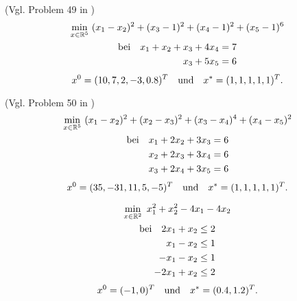 \begin{testproblem}
(Vgl. Problem 49 in \cite[S.~72]{hock})
\begin{gather}
\min_{x\in\mathbb{R}^5}\ (x_1-x_2)^2 + (x_3-1)^2 + (x_4-1)^2 + (x_5-1)^6  \notag \\
\begin{split}
\text{bei}\quad x_1 + x_2 + x_3 + 4 x_4 & = 7 \\
x_3 + 5 x_5 & = 6 \\
\end{split}
\end{gather}
\begin{equation*}
x^0 = (10, 7, 2, -3, 0.8)^T \quad\text{und}\quad x^* = (1, 1, 1, 1, 1)^T.
\end{equation*}
\end{testproblem}

\begin{testproblem}
\label{test_prob:prob_A_hs50}
(Vgl. Problem 50 in \cite[S.~73]{hock})
\begin{gather}
\min_{x\in\mathbb{R}^5}\ (x_1-x_2)^2 + (x_2-x_3)^2 + (x_3-x_4)^4 + (x_4-x_5)^2  \notag \\
\begin{split}
\text{bei}\quad x_1 + 2 x_2 + 3 x_3 & = 6 \\
x_2 + 2 x_3 + 3 x_4 & = 6 \\
x_3 + 2 x_4 + 3 x_5 & = 6 \\
\end{split}
\end{gather}
\begin{equation*}
x^0 = (35, -31, 11, 5, -5)^T \quad\text{und}\quad x^* = (1, 1, 1, 1, 1)^T.
\end{equation*}
\end{testproblem}

\begin{testproblem}
\begin{gather}
\min_{x\in\mathbb{R}^2}\ x_1^2 + x_2^2 - 4 x_1 - 4 x_2 \notag \\
\begin{split}
\text{bei}\quad 2 x_1 + x_2 & \leq 2 \\
x_1 - x_2 & \leq 1 \\
-x_1 - x_2 & \leq 1 \\
-2 x_1 + x_2 & \leq 2 \\
\end{split}
\end{gather}
\begin{equation*}
x^0 = (-1, 0)^T \quad\text{und}\quad x^* = (0.4, 1.2)^T.
\end{equation*}
\end{testproblem}

